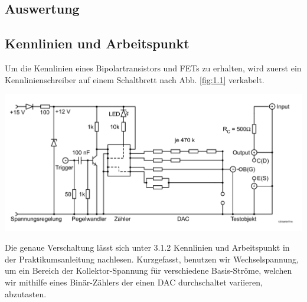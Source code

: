 \documentclass[10pt]{article}
\newenvironment{Figure}
  {\par\medskip\noindent\minipage{\linewidth}}
  {\endminipage\par\medskip}
\begin{document}
\begin{multicols}{2}
	\section{Auswertung}
	\subsection{Kennlinien und Arbeitspunkt}
	Um die Kennlinien eines Bipolartransistors und FETs zu erhalten, wird zuerst ein Kennlinienschreiber auf einem Schaltbrett nach Abb. \ref{fig:1.1} verkabelt.
	\begin{Figure}
		\centering\includegraphics[width=1\textwidth]{kennlinienschreiber.png}
		\label{fig:1.1}
	\end{Figure}
	Die genaue Verschaltung lässt sich unter 3.1.2 Kennlinien und Arbeitspunkt\cite{Praktikumsanleitung} in der Praktikumsanleitung nachlesen.
	Kurzgefasst, benutzen wir Wechselspannung, um ein Bereich der Kollektor-Spannung für verschiedene Basis-Ströme, welchen wir mithilfe eines Binär-Zählers der einen DAC durchschaltet variieren, abzutasten.


\end{multicols}
\end{document}
